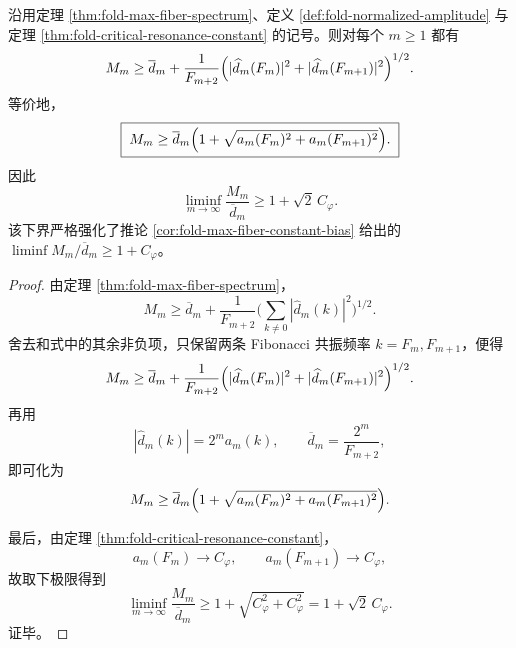 \begin{theorem}\label{thm:fold-max-fiber-two-resonance-bias-strengthening}
沿用定理 \ref{thm:fold-max-fiber-spectrum}、定义 \ref{def:fold-normalized-amplitude} 与定理 \ref{thm:fold-critical-resonance-constant} 的记号。则对每个 \(m\ge 1\) 都有
\[
M_m
\ge
\overline d_m
+
\frac{1}{F_{m+2}}
\Bigl(
|\widehat d_m(F_m)|^2+|\widehat d_m(F_{m+1})|^2
\Bigr)^{1/2}.
\]
等价地，
\[
\boxed{\;
M_m
\ge
\overline d_m\Bigl(1+\sqrt{a_m(F_m)^2+a_m(F_{m+1})^2}\Bigr).\;}
\]
因此
\[
\boxed{\;
\liminf_{m\to\infty}\frac{M_m}{\overline d_m}
\ge
1+\sqrt2\,C_\varphi.\;}
\]
该下界严格强化了推论 \ref{cor:fold-max-fiber-constant-bias} 给出的
\(
\liminf M_m/\overline d_m\ge 1+C_\varphi
\)。
\end{theorem}
\begin{proof}
由定理 \ref{thm:fold-max-fiber-spectrum}，
\[
M_m\ge \overline d_m+\frac{1}{F_{m+2}}
\Biggl(\sum_{k\ne 0}|\widehat d_m(k)|^2\Biggr)^{1/2}.
\]
舍去和式中的其余非负项，只保留两条 Fibonacci 共振频率 \(k=F_m,F_{m+1}\)，便得
\[
M_m
\ge
\overline d_m
+
\frac{1}{F_{m+2}}
\Bigl(
|\widehat d_m(F_m)|^2+|\widehat d_m(F_{m+1})|^2
\Bigr)^{1/2}.
\]
再用
\[
|\widehat d_m(k)|=2^m a_m(k),
\qquad
\overline d_m=\frac{2^m}{F_{m+2}},
\]
即可化为
\[
M_m
\ge
\overline d_m\Bigl(1+\sqrt{a_m(F_m)^2+a_m(F_{m+1})^2}\Bigr).
\]

最后，由定理 \ref{thm:fold-critical-resonance-constant}，
\[
a_m(F_m)\to C_\varphi,
\qquad
a_m(F_{m+1})\to C_\varphi,
\]
故取下极限得到
\[
\liminf_{m\to\infty}\frac{M_m}{\overline d_m}
\ge
1+\sqrt{C_\varphi^2+C_\varphi^2}
=
1+\sqrt2\,C_\varphi.
\]
证毕。
\end{proof}
